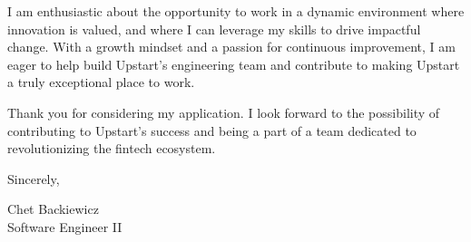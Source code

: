 \documentclass[12pt]{letter}
\begin{document}
I am enthusiastic about the opportunity to work in a dynamic environment where innovation is valued, and where I can leverage my skills to drive impactful change. With a growth mindset and a passion for continuous improvement, I am eager to help build Upstart's engineering team and contribute to making Upstart a truly exceptional place to work.

Thank you for considering my application. I look forward to the possibility of contributing to Upstart's success and being a part of a team dedicated to revolutionizing the fintech ecosystem.

\vspace{0.1in}
\vfill

\begin{flushright}
Sincerely,

Chet Backiewicz\\
Software Engineer II
\end{flushright}
\end{document}
